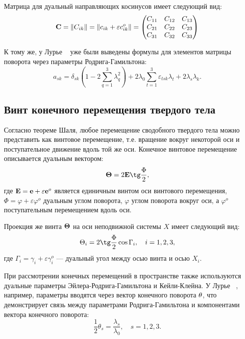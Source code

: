 Матрица для дуальный направляющих косинусов имеет следующий вид:
\begin{equation*}
    \vb{C} = \|C_{ik}\| = \|c_{ik} + \varepsilon c_{ik}^o\| = \begin{pmatrix}
        C_{11} & C_{12} & C_{13} \\
        C_{21} & C_{22} & C_{23} \\
        C_{31} & C_{32} & C_{33}
        \end{pmatrix}
\end{equation*}

К тому же, у Лурье ~\cite{Lurie:1961} уже были выведены формулы для элементов матрицы поворота через параметры Родрига-Гамильтона:
\begin{equation*}
    a_{sk} = \delta_{sk}\left(1 - 2\sum_{q=1}^3 \lambda_q^2\right) + 2\lambda_0 \sum_{t=1}^3 \varepsilon_{tsk}\lambda_t + 2\lambda_s\lambda_k.
\end{equation*}

\subsection{Винт конечного перемещения твердого тела}

Согласно теореме Шаля, любое перемещение сводобного твердого тела можно представить как винтовое перемещение, т.е. вращение вокруг некоторой оси и поступательное движение вдоль той же оси. Конечное винтовое перемещение описывается дуальным вектором:
\begin{equation*}
    \vb{\Theta} = 2\vb{E} \tg \frac{\Phi}{2},
\end{equation*}
где $\vb{E} = \vb{e} + \varepsilon \vb{e}^o$ является единичным винтом оси винтового перемещения, $\Phi = \varphi + \varepsilon \varphi^o$ дуальным углом поворота, $\varphi$ углом поворота вокруг оси, а $\varphi^o$ поступательным перемещением вдоль оси.

Проекция же винта $\vb{\Theta}$ на оси неподвижной системы $X$ имеет следующий вид:
\begin{equation*}
    \Theta_i = 2 \tg \frac{\Phi}{2} \cos \Gamma_i, \quad i = 1, 2, 3,
\end{equation*}
где $\Gamma_i = \gamma_i + \varepsilon \gamma_i^o$ --- дуальный угол между осью винта и осью $X_i$.

При рассмотрении конечных перемещений в пространстве также используются дуальные параметры Эйлера-Родрига-Гамильтона и Кейли-Клейна. У Лурье ~\cite{Lurie:1961}, например, параметры вводятся через вектор конечного поворота $\vb{\theta}$, что демонстрирует связь между параметрами Родрига-Гамильтона и компонентами вектора конечного поворота:
\begin{equation*}
    \frac{1}{2}\theta_s = \frac{\lambda_s}{\lambda_0}, \quad s = 1,2,3.
\end{equation*}

